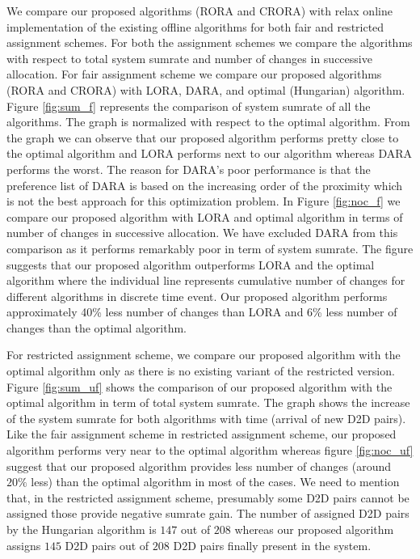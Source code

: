 \documentclass[times]{dacauth}
\begin{document}
\smallskip
\noindent
We compare our proposed algorithms (RORA and CRORA) with relax online implementation of the existing offline algorithms for both fair and restricted assignment schemes. For both the assignment schemes we compare the algorithms with respect to total system sumrate and number of changes in successive allocation.
For fair assignment scheme we compare our proposed algorithms (RORA and CRORA) with LORA, DARA, and optimal (Hungarian) algorithm. Figure \ref{fig:sum_f} represents the comparison of system sumrate of all the algorithms. The graph is normalized with respect to the optimal algorithm. From the graph we can observe that our proposed algorithm performs pretty close to the optimal algorithm and LORA performs next to our algorithm whereas DARA performs the worst. The reason for DARA's poor performance is that the preference list of DARA is based on the increasing order of the proximity which is not the best approach for this optimization problem. In Figure  \ref{fig:noc_f} we compare our proposed algorithm with LORA and optimal algorithm in terms of number of changes in successive allocation. We have excluded DARA from this comparison as it performs remarkably poor in term of system sumrate. The figure suggests that our proposed algorithm outperforms LORA and the optimal algorithm where the individual line represents cumulative number of changes for different algorithms in discrete time event. Our proposed algorithm performs approximately 40\% less number of changes than LORA and 6\% less number of changes than the optimal algorithm.

\smallskip
\noindent
For restricted assignment scheme, we compare our proposed algorithm with the optimal algorithm only as there is no existing variant of the restricted version. Figure \ref{fig:sum_uf} shows the comparison of our proposed algorithm with the optimal algorithm in term of total system sumrate. The graph shows the increase of the system sumrate for both algorithms with time (arrival of new D2D pairs). Like the fair assignment scheme in restricted assignment scheme, our proposed algorithm performs very near to the optimal algorithm whereas figure \ref{fig:noc_uf} suggest that our proposed algorithm provides less number of changes (around $20\%$ less) than the optimal algorithm in most of the cases. We need to mention that, in the restricted assignment scheme, presumably some D2D pairs cannot be assigned those provide negative sumrate gain. The number of assigned D2D pairs by the Hungarian algorithm is $147$ out of $208$ whereas our proposed algorithm assigns $145$ D2D pairs out of $208$ D2D pairs finally present in the system.  
\end{document}
